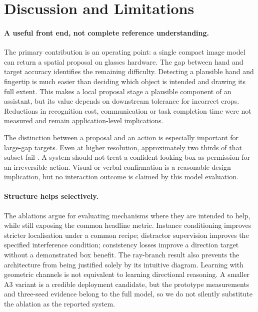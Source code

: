 ﻿\section{Discussion and Limitations}
\paragraph{A useful front end, not complete reference understanding.}
The primary contribution is an operating point: a single compact image model can return a spatial proposal on glasses hardware. The gap between hand and target accuracy identifies the remaining difficulty. Detecting a plausible hand and fingertip is much easier than deciding which object is intended and drawing its full extent. This makes a local proposal stage a plausible component of an assistant, but its value depends on downstream tolerance for incorrect crops. Reductions in recognition cost, communication or task completion time were not measured and remain application-level implications.

The distinction between a proposal and an action is especially important for large-gap targets. Even at higher resolution, approximately two thirds of that subset fail . A system should not treat a confident-looking box as permission for an irreversible action. Visual or verbal confirmation is a reasonable design implication, but no interaction outcome is claimed by this model evaluation.

\paragraph{Structure helps selectively.}
The ablations argue for evaluating mechanisms where they are intended to help, while still exposing the common headline metric. Instance conditioning improves stricter localisation under a common recipe; distractor supervision improves the specified interference condition; consistency losses improve a direction target without a demonstrated box benefit. The ray-branch result also prevents the architecture from being justified solely by its intuitive diagram. Learning with geometric channels is not equivalent to learning directional reasoning. A smaller A3 variant is a credible deployment candidate, but the prototype measurements and three-seed evidence belong to the full model, so we do not silently substitute the ablation as the reported system.

